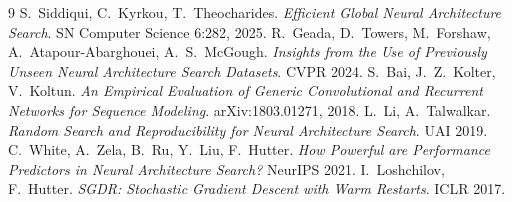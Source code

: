 \documentclass[10pt,twocolumn]{article}
\begin{document}
\clearpage
\begin{thebibliography}{9}\footnotesize\setlength{\itemsep}{1pt}\setlength{\parskip}{0pt}
 S.~Siddiqui, C.~Kyrkou, T.~Theocharides.
\emph{Efficient Global Neural Architecture Search}. SN Computer Science
6:282, 2025.
 R.~Geada, D.~Towers, M.~Forshaw, A.~Atapour-Abarghouei,
A.~S.~McGough. \emph{Insights from the Use of Previously Unseen Neural
Architecture Search Datasets}. CVPR 2024.
 S.~Bai, J.~Z.~Kolter, V.~Koltun. \emph{An Empirical
Evaluation of Generic Convolutional and Recurrent Networks for Sequence
Modeling}. arXiv:1803.01271, 2018.
 L.~Li, A.~Talwalkar. \emph{Random Search and
Reproducibility for Neural Architecture Search}. UAI 2019.
 C.~White, A.~Zela, B.~Ru, Y.~Liu, F.~Hutter.
\emph{How Powerful are Performance Predictors in Neural Architecture
Search?} NeurIPS 2021.
 I.~Loshchilov, F.~Hutter. \emph{SGDR: Stochastic Gradient
Descent with Warm Restarts}. ICLR 2017.
\end{thebibliography}
\end{document}
